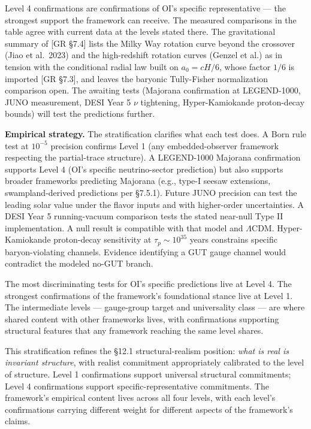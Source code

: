 \documentclass[
]{article}
\begin{document}
Level 4 confirmations are confirmations of OI's specific representative
--- the strongest support the framework can receive. The measured
comparisons in the table agree with current data at the levels stated
there. The gravitational summary of {[}GR §7.4{]} lists the Milky Way
rotation curve beyond the crossover (Jiao et al.~2023) and the
high-redshift rotation curves (Genzel et al.) as in tension with the
conditional radial law built on \(a_0 = cH/6\), whose factor \(1/6\) is
imported {[}GR §7.3{]}, and leaves the baryonic Tully-Fisher
normalization comparison open. The awaiting tests (Majorana confirmation
at LEGEND-1000, JUNO measurement, DESI Year 5 \(\nu\) tightening,
Hyper-Kamiokande proton-decay bounds) will test the predictions further.

\textbf{Empirical strategy.} The stratification clarifies what each test
does. A Born rule test at \(10^{-5}\) precision confirms Level 1 (any
embedded-observer framework respecting the partial-trace structure). A
LEGEND-1000 Majorana confirmation supports Level 4 (OI's specific
neutrino-sector prediction) but also supports broader frameworks
predicting Majorana (e.g., type-I seesaw extensions, swampland-derived
predictions per §7.5.1). Future JUNO precision can test the leading
solar value under the flavor inputs and with higher-order uncertainties.
A DESI Year 5 running-vacuum comparison tests the stated near-null Type
II implementation. A null result is compatible with that model and
\(\Lambda\)CDM. Hyper-Kamiokande proton-decay sensitivity at
\(\tau_p \sim 10^{35}\) years constrains specific baryon-violating
channels. Evidence identifying a GUT gauge channel would contradict the
modeled no-GUT branch.

The most discriminating tests for OI's specific predictions live at
Level 4. The strongest confirmations of the framework's foundational
stance live at Level 1. The intermediate levels --- gauge-group target
and universality class --- are where shared content with other
frameworks lives, with confirmations supporting structural features that
any framework reaching the same level shares.

This stratification refines the §12.1 structural-realism position:
\emph{what is real is invariant structure}, with realist commitment
appropriately calibrated to the level of structure. Level 1
confirmations support universal structural commitments; Level 4
confirmations support specific-representative commitments. The
framework's empirical content lives across all four levels, with each
level's confirmations carrying different weight for different aspects of
the framework's claims.
\end{document}
